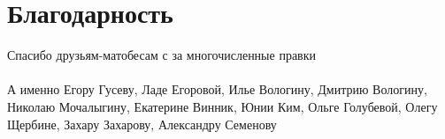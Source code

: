 \documentclass[main]{subfiles}
\begin{document}




    \newpage
    \section{Благодарность}
    Спасибо друзьям-матобесам с за многочисленные правки
    \\ \ \\
    А именно Егору Гусеву, Ладе Егоровой, Илье Вологину, Дмитрию Вологину, Николаю Мочалыгину, Екатерине Винник, Юнии Ким, Ольге Голубевой, Олегу Щербине, Захару Захарову, Александру Семенову
\end{document}
